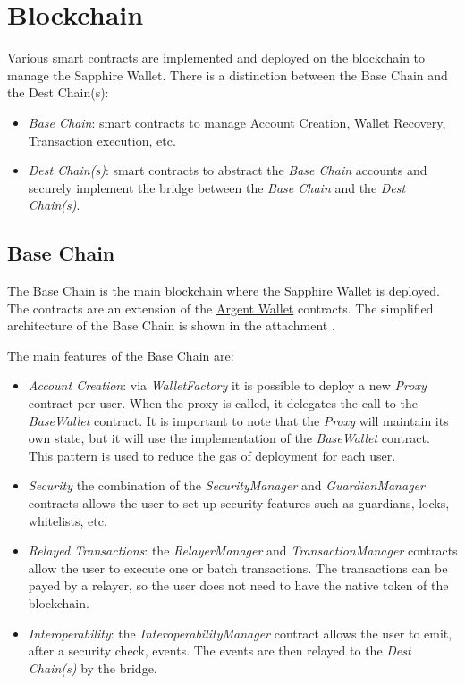 \section{Blockchain}
\label{sec:blockchain}

Various smart contracts are implemented  and deployed on the blockchain to manage the Sapphire Wallet. There is a distinction between the Base Chain and the Dest Chain(s):
\begin{itemize}
    \item \textit{Base Chain}: smart contracts to manage Account Creation, Wallet Recovery, Transaction execution, etc.
    \item \textit{Dest Chain(s)}: smart contracts to abstract the \textit{Base Chain} accounts and securely implement the bridge between the \textit{Base Chain} and the \textit{Dest Chain(s)}. 
\end{itemize}

\subsection{Base Chain}
\label{subsec:base_chain}

The Base Chain is the main blockchain where the Sapphire Wallet is deployed. The contracts are an extension of the \hyperref[subsec:argent]{Argent Wallet} contracts. The simplified architecture of the Base Chain is shown in the attachment .

The main features of the Base Chain are:
\begin{itemize}
    \item \textit{Account Creation}: via \textit{WalletFactory} it is possible to deploy a new \textit{Proxy} contract per user. When the proxy is called, it delegates the call to the \textit{BaseWallet} contract. It is important to note that the \textit{Proxy} will maintain its own state, but it will use the implementation of the \textit{BaseWallet} contract. This pattern is used to reduce the gas of deployment for each user.
    \item \textit{Security} the combination of the \textit{SecurityManager} and \textit{GuardianManager} contracts allows the user to set up security features such as guardians, locks, whitelists, etc.
    \item \textit{Relayed Transactions}: the \textit{RelayerManager} and \textit{TransactionManager} contracts allow the user to execute one or batch transactions. The transactions can be payed by a relayer, so the user does not need to have the native token of the blockchain. 
    \item \textit{Interoperability}: the \textit{InteroperabilityManager} contract allows the user to emit, after a security check, events. The events are then relayed to the \textit{Dest Chain(s)} by the bridge.
\end{itemize}

